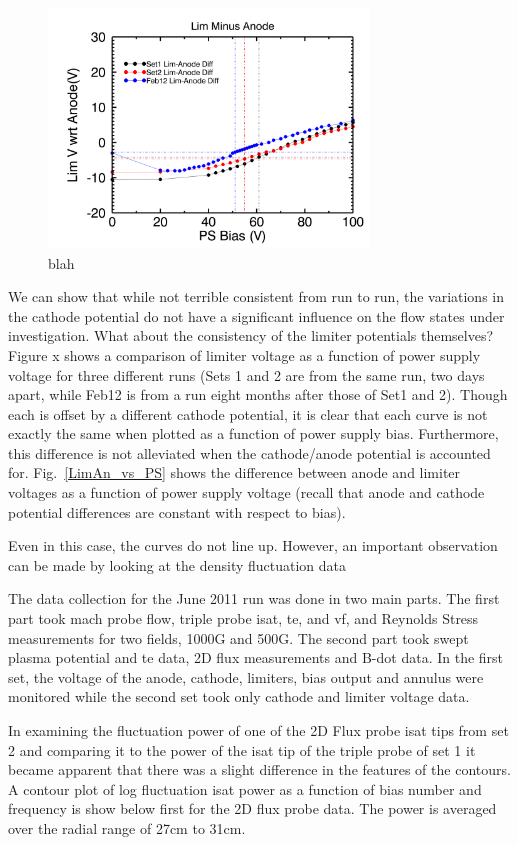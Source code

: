 \documentclass[aip,pop,amsmath,amssymb,preprint,superscriptaddress]{revtex4-1} %
\begin{document}
\begin{figure}[!htbp]
\centerline{
\includegraphics[width=8.5cm]{LimAn_vs_PS}}
\caption{\label{fig:LimAn_vs_PS} blah}
\end{figure}

We can show that while not terrible consistent from run to run, the variations in the cathode potential do not have a significant influence on the flow states under investigation. What about the consistency of the limiter potentials themselves? Figure x shows a comparison of limiter voltage as a function of power supply voltage for three different runs (Sets 1 and 2 are from the same run, two days apart, while Feb12 is from a run eight months after those of Set1 and 2). Though each is offset by a different cathode potential, it is clear that each curve is not exactly the same when plotted as a function of power supply bias. Furthermore, this difference is not alleviated when the cathode/anode potential is accounted for. Fig.~\ref{LimAn_vs_PS} shows the difference between anode and limiter voltages as a function of power supply voltage (recall that anode and cathode potential differences are constant with respect to bias). 

Even in this case, the curves do not line up. However, an important observation can be made by looking at the density fluctuation data

The data collection for the June 2011 run was done in two main parts. The first part took mach probe flow, triple probe isat, te, and vf, and Reynolds Stress measurements for two fields, 1000G and 500G. The second part took swept plasma potential and te data, 2D flux measurements and B-dot data. In the first set, the voltage of the anode, cathode, limiters, bias output and annulus were monitored while the second set took only cathode and limiter voltage data.

In examining the fluctuation power of one of the 2D Flux probe isat tips from set 2 and comparing it to the power of the isat tip of the triple probe of set 1 it became apparent that there was a slight difference in the features of the contours. A contour plot of log fluctuation isat power as a function of bias number and frequency is show below first for the 2D flux probe data. The power is averaged over the radial range of 27cm to 31cm.
\end{document}
